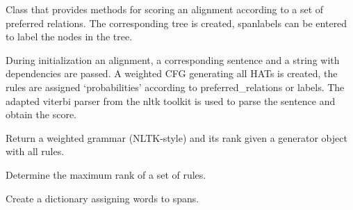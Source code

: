 \documentclass[letterpaper,10pt,english]{sphinxmanual}
\begin{document}
\begin{fulllineitems}
\label{scoring:scoring.Scoring}
Class that provides methods for scoring an alignment according
to a set of preferred relations. The corresponding tree
is created, spanlabels can be entered to label the nodes
in the tree.

During initialization an alignment, a corresponding
sentence and a string with dependencies are passed.
A weighted CFG generating all HATs is created, the rules are
assigned `probabilities' according to preferred\_relations or
labels.
The adapted viterbi parser from the nltk toolkit is
used to parse the sentence and obtain the score.

\begin{fulllineitems}
\label{scoring:scoring.Scoring.grammar}
Return a weighted grammar (NLTK-style) and its rank
given a generator object with all rules.

\end{fulllineitems}


\begin{fulllineitems}
\label{scoring:scoring.Scoring.grammar_rank}
Determine the maximum rank of a set of rules.

\end{fulllineitems}


\begin{fulllineitems}
\label{scoring:scoring.Scoring.list_productions}
\end{fulllineitems}


\begin{fulllineitems}
\label{scoring:scoring.Scoring.make_lexdict}
Create a dictionary assigning words to spans.

\end{fulllineitems}



\end{fulllineitems}
\end{document}
